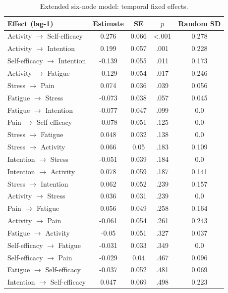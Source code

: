 \begin{table}[H]
\raggedright
\caption{Extended six-node model: temporal fixed effects.}
\label{tab:sup-extended}
\scriptsize
\begingroup
\setlength{\tabcolsep}{4pt}
\renewcommand{\arraystretch}{1.08}
\noindent
\begin{tabular*}{\textwidth}{@{\extracolsep{\fill}}lcccc@{}}
\toprule
Effect (lag-1) & Estimate & SE & $p$ & Random SD \\
\midrule
Activity $\rightarrow$ Self-efficacy & 0.276 & 0.066 & <.001 & 0.278 \\
Activity $\rightarrow$ Intention & 0.199 & 0.057 & .001 & 0.228 \\
Self-efficacy $\rightarrow$ Intention & -0.139 & 0.055 & .011 & 0.173 \\
Activity $\rightarrow$ Fatigue & -0.129 & 0.054 & .017 & 0.246 \\
Stress $\rightarrow$ Pain & 0.074 & 0.036 & .039 & 0.056 \\
Fatigue $\rightarrow$ Stress & -0.073 & 0.038 & .057 & 0.045 \\
Fatigue $\rightarrow$ Intention & -0.077 & 0.047 & .099 & 0.0 \\
Pain $\rightarrow$ Self-efficacy & -0.078 & 0.051 & .125 & 0.0 \\
Stress $\rightarrow$ Fatigue & 0.048 & 0.032 & .138 & 0.0 \\
Stress $\rightarrow$ Activity & 0.066 & 0.05 & .183 & 0.109 \\
Intention $\rightarrow$ Stress & -0.051 & 0.039 & .184 & 0.0 \\
Intention $\rightarrow$ Activity & 0.078 & 0.059 & .187 & 0.141 \\
Stress $\rightarrow$ Intention & 0.062 & 0.052 & .239 & 0.157 \\
Activity $\rightarrow$ Stress & 0.036 & 0.031 & .239 & 0.0 \\
Pain $\rightarrow$ Fatigue & 0.056 & 0.049 & .258 & 0.164 \\
Activity $\rightarrow$ Pain & -0.061 & 0.054 & .261 & 0.243 \\
Fatigue $\rightarrow$ Activity & -0.05 & 0.051 & .327 & 0.037 \\
Self-efficacy $\rightarrow$ Fatigue & -0.031 & 0.033 & .349 & 0.0 \\
Self-efficacy $\rightarrow$ Pain & -0.029 & 0.04 & .467 & 0.096 \\
Fatigue $\rightarrow$ Self-efficacy & -0.037 & 0.052 & .481 & 0.069 \\
Intention $\rightarrow$ Self-efficacy & 0.047 & 0.069 & .498 & 0.223 \\

\end{tabular*}
\end{table}
